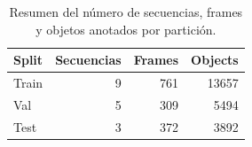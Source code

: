\begin{table}
\caption{Resumen del número de secuencias, frames y objetos anotados por partición.}
\label{tab:tracking_dataset_split_summary}
\begin{tabular}{lrrr}
\toprule
Split & Secuencias & Frames & Objects \\
\midrule
Train & 9 & 761 & 13657 \\
Val & 5 & 309 & 5494 \\
Test & 3 & 372 & 3892 \\
\bottomrule
\end{tabular}
\end{table}
